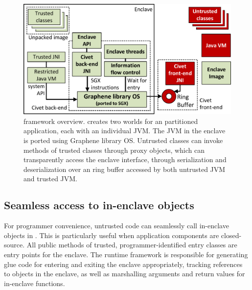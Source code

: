 
\begin{figure}[t!]
\centering
\includegraphics[width=4.5in]{civet/figures/civet-structure.pdf}
\caption[\sysname{}: framework overview.]
{\sysname{} framework overview.
\sysname{} creates two worlds for an partitioned \java{} application, each with an individual JVM.
The JVM in the enclave is ported using Graphene library OS.
Untrusted classes can invoke methods of trusted classes through proxy objects,
which can transparently access the enclave interface, through serialization
and deserialization over an ring buffer accessed by both untrusted JVM and trusted JVM. }
\label{fig:runtime}
\end{figure}


\subsection{Seamless access to in-enclave objects}
\label{sec:concept:accessing}

For programmer convenience, 
untrusted code can seamlessly call in-enclave objects in \sysname{}.
This is particularly useful when application components are closed-source.
All public methods of trusted, programmer-identified entry classes are entry points for the enclave.
The \sysname{} runtime framework is responsible for generating glue code for entering and exiting
the enclave appropriately, tracking references to objects in the enclave, 
as well as marshalling arguments and return values for in-enclave functions.

